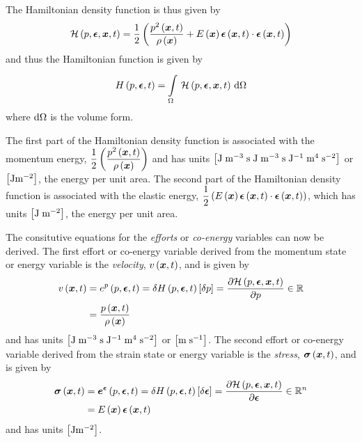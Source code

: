 The Hamiltonian density function is thus given by
\begin{equation}
     \mathcal{H} \left( p, \boldsymbol{\epsilon} , \boldsymbol{x} ,t \right)  =\dfrac{1}{2}\left( \dfrac{ p^{2}\left(  \boldsymbol{x} ,t \right) }{ \rho\left(  \boldsymbol{x}  \right) }+ E\left(  \boldsymbol{x}  \right)    \boldsymbol{\epsilon} \left(  \boldsymbol{x} ,t \right)   \cdot    \boldsymbol{\epsilon} \left(  \boldsymbol{x} ,t \right)   \right)
\end{equation}
and thus the Hamiltonian function is given by
\begin{equation}
  \hamiltonian{p,\vectr{\epsilon},t}=\gint{\Omega}{}{\hamiltoniandensity{p,\vectr{\epsilon},\vectr{x},t}}{\Omega}
\end{equation}
where $  { \mathrm{d} }\Omega  $ is the volume form.

The first part of the Hamiltonian density function is associated with
the momentum energy,
$\dfrac{1}{2}\left( \dfrac{ p^{2}\left(  \boldsymbol{x} ,t \right) }{ \rho\left(  \boldsymbol{x}  \right) } \right)$
and has units
$\left[ \mathrm{J}\thickspace\mathrm{m}^{-3}\thickspace\mathrm{s}\thickspace\mathrm{J}\thickspace\mathrm{m}^{-3}\thickspace\mathrm{s}\thickspace\mathrm{J}^{-1}\thickspace\mathrm{m}^{4}\thickspace\mathrm{s}^{-2} \right]$
or $\left[ \mathrm{J}\mathrm{m}^{-2} \right]$, the energy per unit area. The second part of
the Hamiltonian density function is associated with the elastic
energy,
$\dfrac{1}{2}\left(  E\left(  \boldsymbol{x}  \right)    \boldsymbol{\epsilon} \left(  \boldsymbol{x} ,t \right)   \cdot    \boldsymbol{\epsilon} \left(  \boldsymbol{x} ,t \right)   \right)$, which has units $\left[ \mathrm{J}\thickspace\mathrm{m}^{-2} \right]$, the energy per unit area. 

The consitutive equations for the \emph{efforts} or \emph{co-energy} variables can now be derived. The first effort or co-energy variable derived from the momentum state or energy variable is the \emph{velocity}, $ v\left(  \boldsymbol{x} ,t \right) $, and is given by
\begin{align}
  \fnof{v}{\vectr{x},t}&=\fnof{e^{p}}{p,\vectr{\epsilon},t}=\variation{\hamiltonian{p,\vectr{\epsilon},t}}{p}=\delby{\hamiltoniandensity{p,\vectr{\epsilon},\vectr{x},t}}{p}\in\rntopology{}\\
  &=\dfrac{\fnof{p}{\vectr{x},t}}{\fnof{\rho}{\vectr{x}}}
\end{align}
and has units $\left[ \mathrm{J}\thickspace\mathrm{m}^{-3}\thickspace\mathrm{s}\thickspace\mathrm{J}^{-1}\thickspace\mathrm{m}^{4}\thickspace\mathrm{s}^{-2} \right]$ or $\left[ \mathrm{m}\thickspace\mathrm{s}^{-1} \right]$. The second effort or co-energy variable derived from the strain state or energy variable is the \emph{stress}, $ \boldsymbol{\mathit{\sigma}}\left(  \boldsymbol{x} ,t \right) $, and is given by
\begin{align}
  \fnof{\tensor{\sigma}}{\vectr{x},t}&=\fnof{\vectr{e}^{\vectr{\epsilon}}}{p,\vectr{\epsilon},t}=\variation{\hamiltonian{p,\vectr{\epsilon},t}}{\vectr{\epsilon}}=\delby{\hamiltoniandensity{p,\vectr{\epsilon},\vectr{x},t}}{\vectr{\epsilon}}\in\rntopology{n}\\
  &=\fnof{E}{\vectr{x}}\fnof{\vectr{\epsilon}}{\vectr{x},t}
\end{align}
and has units $\left[ \mathrm{J}\mathrm{m}^{-2} \right]$.

